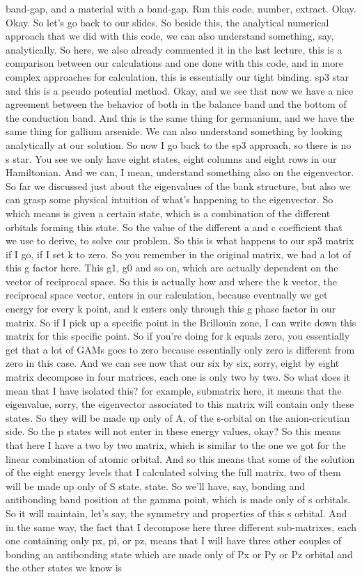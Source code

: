 band-gap, and a material with a band-gap. Run this code, number, extract. Okay. Okay. So let's go back to our slides. So beside this, the analytical numerical approach that we did with this code, we can also understand something, say, analytically. So here, we also already commented it in the last lecture, this is a comparison between our calculations and one done with this code, and in more complex approaches for calculation, this is essentially our tight binding. sp3 star and this is a pseudo potential method. Okay, and we see that now we have a nice agreement between the behavior of both in the balance band and the bottom of the conduction band. And this is the same thing for germanium, and we have the same thing for gallium arsenide. We can also understand something by looking analytically at our solution. So now I go back to the sp3 approach, so there is no s star. You see we only have eight states, eight columns and eight rows in our Hamiltonian. And we can, I mean, understand something also on the eigenvector. So far we discussed just about the eigenvalues of the bank structure, but also we can grasp some physical intuition of what's happening to the eigenvector. So which means is given a certain state, which is a combination of the different orbitals forming this state. So the value of the different a and c coefficient that we use to derive, to solve our problem. So this is what happens to our sp3 matrix if I go, if I set k to zero. So you remember in the original matrix, we had a lot of this g factor here. This g1, g0 and so on, which are actually dependent on the vector of reciprocal space. So this is actually how and where the k vector, the reciprocal space vector, enters in our calculation, because eventually we get energy for every k point, and k enters only through this g phase factor in our matrix. So if I pick up a specific point in the Brillouin zone, I can write down this matrix for this specific point. So if you're doing for k equals zero, you essentially get that a lot of GAMs goes to zero because essentially only zero is different from zero in this case. And we can see now that our six by six, sorry, eight by eight matrix decompose in four matrices, each one is only two by two. So what does it mean that I have isolated this? for example, submatrix here, it means that the eigenvalue, sorry, the eigenvector associated to this matrix will contain only these states. So they will be made up only of A, of the s-orbital on the anion-cricutian side. So the p states will not enter in these energy values, okay? So this means that here I have a two by two matrix, which is similar to the one we got for the linear combination of atomic orbital. And so this means that some of the solution of the eight energy levels that I calculated solving the full matrix, two of them will be made up only of S state. state. So we'll have, say, bonding and antibonding band position at the gamma point, which is made only of s orbitals. So it will maintain, let's say, the symmetry and properties of this s orbital. And in the same way, the fact that I decompose here three different sub-matrixes, each one containing only px, pi, or pz, means that I will have three other couples of bonding an antibonding state which are made only of Px or Py or Pz orbital and the other states we know is 